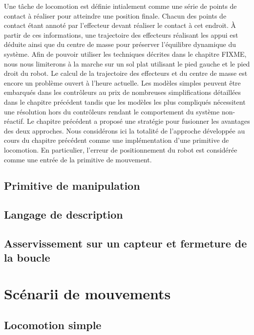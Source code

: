 Une tâche de locomotion est définie intialement comme une série de
points de contact à réaliser pour atteindre une position
finale. Chacun des points de contact étant annoté par l'effecteur
devant réaliser le contact à cet endroit. À partir de ces
informations, une trajectoire des effecteurs réalisant les appui est
déduite ainsi que du centre de masse pour préserver l'équilibre
dynamique du système. Afin de pouvoir utiliser les techniques décrites
dans le chapitre FIXME, nous nous limiterons à la marche sur un sol
plat utilisant le pied gauche et le pied droit du robot. Le calcul de
la trajectoire des effecteurs et du centre de masse est encore un
problème ouvert à l'heure actuelle. Les modèles simples peuvent être
embarqués dans les contrôleurs au prix de nombreuses simplifications
détaillées dans le chapitre précédent tandis que les modèles les plus
compliqués nécessitent une résolution hors du contrôleurs rendant le
comportement du système non-réactif. Le chapitre précédent a proposé
une stratégie pour fusionner les avantages des deux approches. Nous
considérons ici la totalité de l'approche développée au cours du
chapitre précédent comme une implémentation d'une primitive de
locomotion. En particulier, l'erreur de positionnement du robot est
considérée comme une entrée de la primitive de mouvement.

\subsection{Primitive de manipulation}



\subsection{Langage de description}

\subsection{Asservissement sur un capteur et fermeture de la boucle}

\section{Scénarii de mouvements}
\subsection{Locomotion simple}

